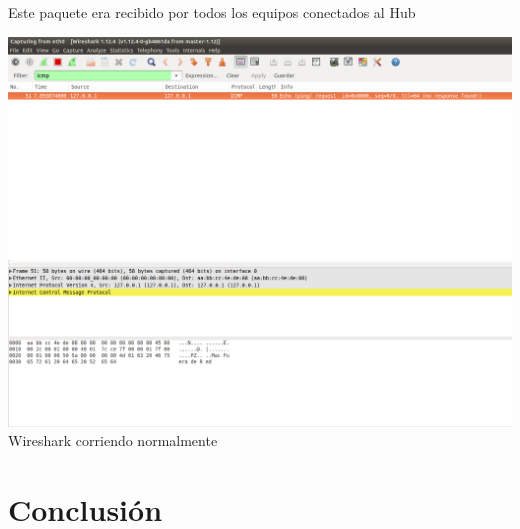 \documentclass[spanish]{udpreport}
\begin{document}
Este paquete era recibido por todos los equipos conectados al Hub

\begin{center}
	\includegraphics[scale=.27]{imagenes/Hub/wireout.png}
	\\ Wireshark corriendo normalmente 
\end{center}

\chapter{Conclusión}

\end{document}
